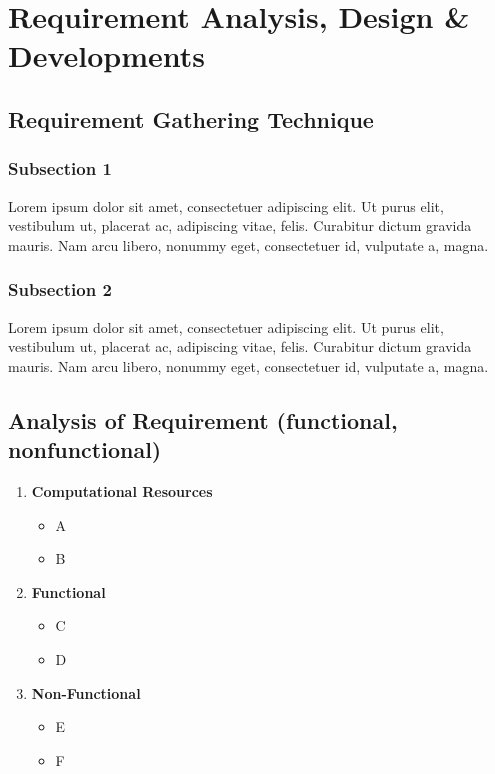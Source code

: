 \chapter{Requirement Analysis, Design \& Developments} 

\section{Requirement Gathering Technique}

\subsection{Subsection 1}

Lorem ipsum dolor sit amet, consectetuer adipiscing elit. Ut purus elit, vestibulum ut, placerat ac, adipiscing vitae, felis. Curabitur dictum gravida mauris. Nam arcu libero, nonummy eget, consectetuer id, vulputate a, magna.

\subsection{Subsection 2}

Lorem ipsum dolor sit amet, consectetuer adipiscing elit. Ut purus elit, vestibulum ut, placerat ac, adipiscing vitae, felis. Curabitur dictum gravida mauris. Nam arcu libero, nonummy eget, consectetuer id, vulputate a, magna.

\section{Analysis of Requirement (functional, nonfunctional)}

\begin{enumerate}[label=\arabic*)]
	\itemsep -0.5em
 	\item \textbf{Computational Resources}
		\begin{itemize}
		    \itemsep -0.5em
		    \item A
      		\item B
		\end{itemize}
	\item \textbf{Functional}
 		\begin{itemize}
		    \itemsep -0.5em
		    \item C
      	    \item D
		\end{itemize}
  
	\item \textbf{Non-Functional}
 		\begin{itemize}
		    \itemsep -0.5em
		    \item E
    	    \item F
		\end{itemize}
\end{enumerate}

